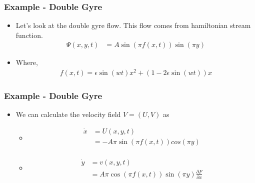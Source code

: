 \documentclass[../presentation.tex]{subfiles}
\begin{document}
\begin{frame}
  \frametitle{Example - Double Gyre}
  
  \begin{itemize}
    \item Let's look at the double gyre flow. This flow comes from hamiltonian stream function.
    \begin{equation}
      \begin{aligned}
        \Psi(x, y, t) &= A\sin(\pi f(x, t)) \sin(\pi y)
      \end{aligned}
    \end{equation}
    
    \item Where,
    \begin{equation}
      \begin{aligned}
        f(x, t) = \epsilon\sin(wt) x^2 + (1 - 2 \epsilon \sin(wt))x
      \end{aligned}
    \end{equation}
  \end{itemize}
\end{frame}

\begin{frame}
  \frametitle{Example - Double Gyre}

  \begin{itemize}
    \item We can calculate the velocity field \(V = (U, V)\) as
    \begin{itemize}
      \item\begin{equation}
        \begin{aligned}
          \dot x &= U(x, y, t) \\
          &= -A\pi\sin(\pi f(x, t)) cos(\pi y) \\
        \end{aligned}
      \end{equation}
      
      \item \begin{equation}
        \begin{aligned}
          \dot y &= v(x, y, t) \\
          &= A\pi\cos(\pi f(x, t)) \sin(\pi y) \frac{\partial F}{\partial x}
        \end{aligned}
      \end{equation}
    \end{itemize}
  \end{itemize}  
\end{frame}
\end{document}
